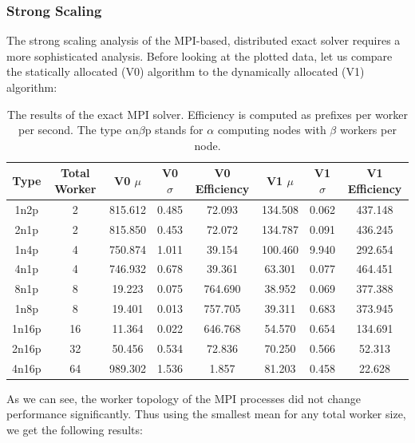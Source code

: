 \subsubsection{Strong Scaling}

The strong scaling analysis of the \ac{MPI}-based, distributed exact solver requires a more sophisticated analysis. Before looking at the plotted data, let us compare the statically allocated (V0) algorithm to the dynamically allocated (V1) algorithm:

\begin{table}[H]
\centering
    \begin{tabular}{|c|c|c|c|c|c|c|c|}
        \hline
        Type & Total Worker & V0 $\mu$ & V0 $\sigma$ & V0 Efficiency & V1 $\mu$ & V1 $\sigma$ & V1 Efficiency\\
        \hline
        1n2p & 2 & 815.612 & 0.485 & 72.093 & 134.508 & 0.062 & 437.148\\
        2n1p & 2 & 815.850 & 0.453 & 72.072 & 134.787 & 0.091 & 436.245\\
        1n4p & 4 & 750.874 & 1.011 & 39.154 & 100.460 & 9.940 & 292.654\\
        4n1p & 4 & 746.932 & 0.678 & 39.361 & 63.301 & 0.077 & 464.451\\
        8n1p & 8 & 19.223 & 0.075 & 764.690 & 38.952 & 0.069 & 377.388\\
        1n8p & 8 & 19.401 & 0.013 & 757.705 & 39.311 & 0.683 & 373.945\\
        1n16p & 16 & 11.364 & 0.022 & 646.768 & 54.570 & 0.654 & 134.691\\
        2n16p & 32 & 50.456 & 0.534 & 72.836 & 70.250 & 0.566 & 52.313\\
        4n16p & 64 & 989.302 & 1.536 & 1.857 & 81.203 & 0.458 & 22.628\\
        \hline
    \end{tabular}
    \caption{The results of the exact \ac{MPI} solver. Efficiency is computed as prefixes per worker per second. The type $\alpha$n$\beta$p stands for $\alpha$ computing nodes with $\beta$ workers per node.}
\end{table}

As we can see, the worker topology of the \ac{MPI} processes did not change performance significantly. Thus using the smallest mean for any total worker size, we get the following results:

